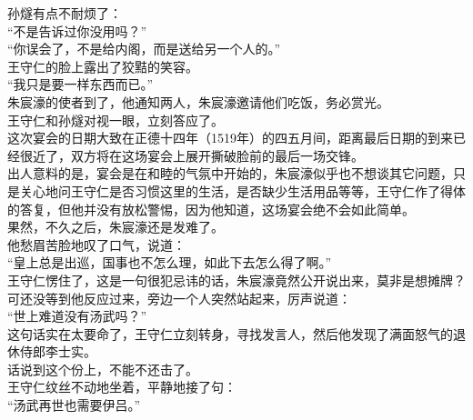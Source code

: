 \begin{multicols}{\theparacolNo}
孙燧有点不耐烦了：\\

“不是告诉过你没用吗？”\\

“你误会了，不是给内阁，而是送给另一个人的。”\\

王守仁的脸上露出了狡黠的笑容。\\

“我只是要一样东西而已。”\\

朱宸濠的使者到了，他通知两人，朱宸濠邀请他们吃饭，务必赏光。\\

王守仁和孙燧对视一眼，立刻答应了。\\

这次宴会的日期大致在正德十四年（1519年）的四五月间，距离最后日期的到来已经很近了，双方将在这场宴会上展开撕破脸前的最后一场交锋。\\

出人意料的是，宴会是在和睦的气氛中开始的，朱宸濠似乎也不想谈其它问题，只是关心地问王守仁是否习惯这里的生活，是否缺少生活用品等等，王守仁作了得体的答复，但他并没有放松警惕，因为他知道，这场宴会绝不会如此简单。\\

果然，不久之后，朱宸濠还是发难了。\\

他愁眉苦脸地叹了口气，说道：\\

“皇上总是出巡，国事也不怎么理，如此下去怎么得了啊。”\\

王守仁愣住了，这是一句很犯忌讳的话，朱宸濠竟然公开说出来，莫非是想摊牌？\\

可还没等到他反应过来，旁边一个人突然站起来，厉声说道：\\

“世上难道没有汤武吗？”\\

这句话实在太要命了，王守仁立刻转身，寻找发言人，然后他发现了满面怒气的退休侍郎李士实。\\

话说到这个份上，不能不还击了。\\

王守仁纹丝不动地坐着，平静地接了句：\\

“汤武再世也需要伊吕。”\\


\end{multicols}
